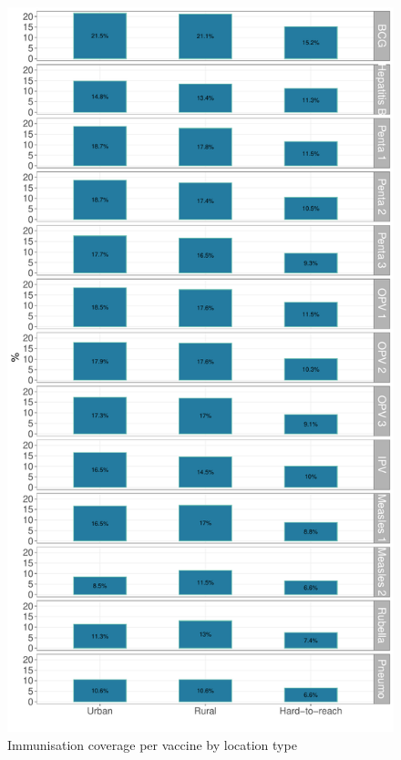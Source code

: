 \documentclass[12pt,a4paper]{article}
\begin{document}
\begin{figure}[H]

{\centering \includegraphics{kayinReport_files/figure-latex/epi3plot-1} 

}

\caption{Immunisation coverage per vaccine by location type}\label{fig:epi3plot}
\end{figure}
\end{document}
